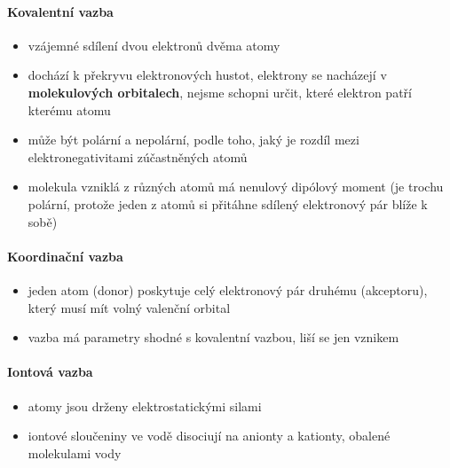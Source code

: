\documentclass[DIV=8]{scrreprt}
\begin{document}
\paragraph{Kovalentní vazba}
\begin{itemize}[nosep]
    \item vzájemné sdílení dvou elektronů dvěma atomy
    \item dochází k překryvu elektronových hustot, elektrony se nacházejí v \textbf{molekulových orbitalech}, nejsme schopni určit, které elektron patří kterému atomu
    \item může být polární a nepolární, podle toho, jaký je rozdíl mezi elektronegativitami zúčastněných atomů
    \item molekula vzniklá z různých atomů má nenulový dipólový moment (je trochu polární, protože jeden z atomů si přitáhne sdílený elektronový pár blíže k sobě)
\end{itemize}



\paragraph{Koordinační vazba}
\begin{itemize}[nosep]
    \item jeden atom (donor) poskytuje celý elektronový pár druhému (akceptoru), který musí mít volný valenční orbital
    \item vazba má parametry shodné s kovalentní vazbou, liší se jen vznikem
\end{itemize}



\paragraph{Iontová vazba}
\begin{itemize}[nosep]
    \item atomy jsou drženy elektrostatickými silami
    \item iontové sloučeniny ve vodě disociují na anionty a kationty, obalené molekulami vody
\end{itemize}
\end{document}
